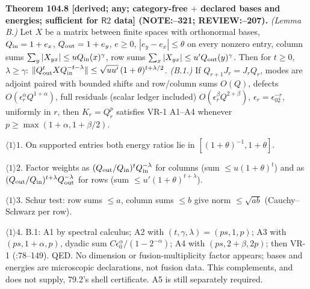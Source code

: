\textbf{Theorem 104.8 [derived; any; category-free \(+\) declared bases and energies; sufficient for \(\mathsf R2\) data] (NOTE:--321; REVIEW:--207).}
\emph{(Lemma B.)} Let \(X\) be a matrix between finite spaces with orthonormal bases, \(Q_{\rm in}=1+e_x\), \(Q_{\rm out}=1+e_y\),
\(e\ge0\), \(|e_y-e_x|\le\theta\) on every nonzero entry, column sums \(\sum_y|X_{yx}|\le uQ_{\rm in}(x)^\gamma\), row sums
\(\sum_x|X_{yx}|\le u'Q_{\rm out}(y)^\gamma\). Then for \(t\ge0\), \(\lambda\ge\gamma\):
\(\|Q_{\rm out}^tXQ_{\rm in}^{-t-\lambda}\|\le\sqrt{uu'}\,(1+\theta)^{t+\lambda/2}\).
\emph{(B.1.)} If \(Q_{r+1}J_r=J_rQ_r\), modes are adjoint paired with bounded shifts and row/column sums \(O(Q)\), defects
\(O(\epsilon_r^\alpha Q^{1+\alpha})\), full residuals (scalar ledger included) \(O(\epsilon_r^\beta Q^{2+\beta})\), \(\epsilon_r=\epsilon_02^{-r}\),
uniformly in \(r\), then \(K_r=Q_r^p\) satisfies VR-1 A1--A4 whenever \(p\ge\max(1+\alpha,1+\beta/2)\).
\par\(\langle1\rangle1\). On supported entries both energy ratios lie in \([(1+\theta)^{-1},1+\theta]\).
\par\(\langle1\rangle2\). Factor weights as \((Q_{\rm out}/Q_{\rm in})^tQ_{\rm in}^{-\lambda}\) for columns (sum \(\le u(1+\theta)^t\)) and as
\((Q_{\rm out}/Q_{\rm in})^{t+\lambda}Q_{\rm out}^{-\lambda}\) for rows (sum \(\le u'(1+\theta)^{t+\lambda}\)).
\par\(\langle1\rangle3\). Schur test: row sums \(\le a\), column sums \(\le b\) give norm \(\le\sqrt{ab}\) (Cauchy--Schwarz per row).
\par\(\langle1\rangle4\). B.1: A1 by spectral calculus; A2 with \((t,\gamma,\lambda)=(ps,1,p)\); A3 with \((ps,1+\alpha,p)\), dyadic sum
\(C\epsilon_0^\alpha/(1-2^{-\alpha})\); A4 with \((ps,2+\beta,2p)\); then VR-1 (:78--149). QED.
No dimension or fusion-multiplicity factor appears; bases and energies are microscopic declarations, not fusion data.
This complements, and does not supply, 79.2's shell certificate. A5 is still separately required.

